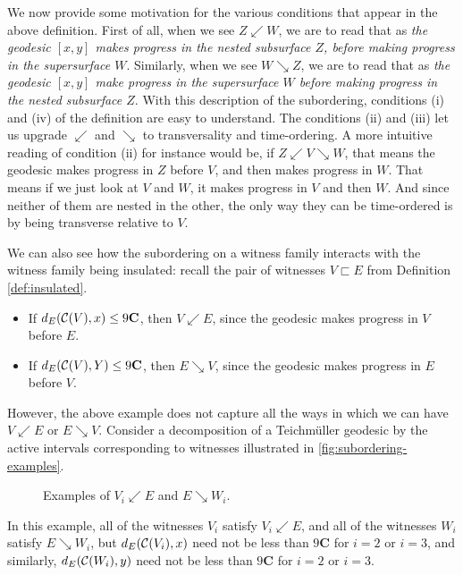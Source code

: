   We now provide some motivation for the various conditions that appear in the above definition.
  First of all, when we see $Z \swarrow W$, we are to read that as \emph{the geodesic $[x,y]$ makes progress in the nested subsurface $Z$, before making progress in the supersurface $W$}.
  Similarly, when we see $W \searrow Z$, we are to read that as \emph{the geodesic $[x,y]$ make progress in the supersurface $W$ before making progress in the nested subsurface $Z$}.
  With this description of the subordering, conditions (i) and (iv) of the definition are easy to understand. The conditions (ii) and (iii) let us upgrade $\swarrow$ and $\searrow$ to transversality and time-ordering.
  A more intuitive reading of condition (ii) for instance would be, if $Z \swarrow V \searrow W$, that means the geodesic makes progress in $Z$ before $V$, and then makes progress in $W$.
  That means if we just look at $V$ and $W$, it makes progress in $V$ and then $W$. And since neither of them are nested in the other, the only way they can be time-ordered is by being transverse relative to $V$.

  We can also see how the subordering on a witness family interacts with the witness family being insulated: recall the pair of witnesses $V \sqsubset E$ from Definition \ref{def:insulated}.
  \begin{itemize}
  \item If $d_E(\mathcal{C}(V), x) \leq 9 \mathbf{C}$, then $V \swarrow E$, since the geodesic makes progress in $V$ before $E$.
  \item If $d_E(\mathcal{C}(V), Y) \leq 9 \mathbf{C}$, then $E \searrow V$, since the geodesic makes progress in $E$ before $V$.
  \end{itemize}
  However, the above example does not capture all the ways in which we can have $V \swarrow E$ or $E \searrow V$.
  Consider a decomposition of a Teichmüller geodesic by the active intervals corresponding to witnesses illustrated in \autoref{fig:subordering-examples}.
  \begin{figure}[h]
    \centering
    \caption{Examples of $V_i \swarrow E$ and $E \searrow W_i$.}
    \label{fig:subordering-examples}
  \end{figure}

  In this example, all of the witnesses $V_i$ satisfy $V_i \swarrow E$, and all of the witnesses $W_i$ satisfy $E \searrow W_i$, but $d_E(\mathcal{C}(V_i), x)$ need not be less than $9\mathbf{C}$ for $i=2$ or $i=3$, and similarly, $d_E(\mathcal{C}(W_i), y)$ need not be less than $9 \mathbf{C}$ for $i=2$ or $i=3$.

